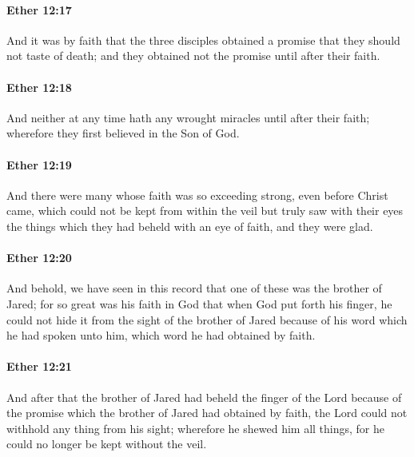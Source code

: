 		\paragraph{Ether 12:17} %
			\label{ETHER-12-17}

			And it was by faith that the three disciples obtained a promise
			that they should not taste of death;
			and they obtained not the promise until after their faith.

		\paragraph{Ether 12:18} %
			\label{ETHER-12-18}

			And neither at any time hath any wrought miracles until after their faith;
			wherefore they first believed in the Son of God.

		\paragraph{Ether 12:19} %
			\label{ETHER-12-19}

			And there were many whose faith was so exceeding strong,
			even before Christ came,
			which could not be kept from within the veil
			but truly saw with their eyes the things
			which they had beheld with an eye of faith,
			and they were glad.

		\paragraph{Ether 12:20} %
			\label{ETHER-12-20}

			And behold, we have seen in this record
			that one of these was the brother of Jared;
			for so great was his faith in God
			that when God put forth his finger,
			he could not hide it from the sight of the brother of Jared
			because of his word which he had spoken unto him,
			which word he had obtained by faith.

		\paragraph{Ether 12:21} %
			\label{ETHER-12-21}

			And after that the brother of Jared had beheld the finger of the Lord
			because of the promise which the brother of Jared had obtained by faith,
			the Lord could not withhold any thing from his sight;
			wherefore he shewed him all things,
			for he could no longer be kept without the veil.

